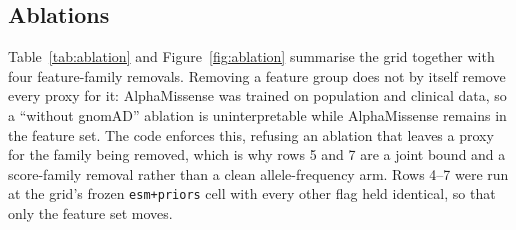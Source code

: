 \documentclass{bioinfo}
\begin{document}
\subsection{Ablations}

Table~\ref{tab:ablation} and Figure~\ref{fig:ablation} summarise the grid
together with four feature-family removals. Removing a feature group does not by itself remove every proxy for it:
AlphaMissense was trained on population and clinical data, so a ``without
gnomAD'' ablation is uninterpretable while AlphaMissense remains in the feature
set. The code enforces this, refusing an ablation that leaves a proxy for the
family being removed, which is why rows 5 and 7 are a joint bound and a
score-family removal rather than a clean allele-frequency arm. Rows 4--7 were
run at the grid's frozen \texttt{esm+priors} cell with every other flag held
identical, so that only the feature set moves.
\end{document}
